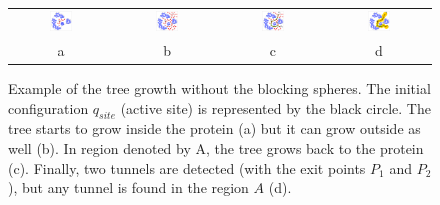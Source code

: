 \documentclass[usletter, 10pt, conference]{svjour3}      %
\def\qinit{q_{site}}
\begin{document}
\begin{figure}
\centering
{
\renewcommand{\tabcolsep}{1pt}
\begin{tabular}{cccc}
\includegraphics[width=0.24\textwidth]{fig/blockingb1} &
\includegraphics[width=0.24\textwidth]{fig/blockingb2} & 
\includegraphics[width=0.24\textwidth]{fig/blockingb3} & 
\includegraphics[width=0.24\textwidth]{fig/blockingb4} \\
a & b & c & d \\
\end{tabular}  
}
\caption{\label{fig::blocking1}
    Example of the tree growth without the blocking spheres. 
    The initial configuration $\qinit$ (active site) is represented by the black circle.
    The tree starts to grow inside the protein (a) but it can grow outside as well (b).
    In region denoted by A, the tree grows back to the protein (c).
    Finally, two tunnels are detected (with the exit points $P_1$ and $P_2$), but any tunnel is found in the region $A$ (d).
}
\end{figure}
\end{document}
